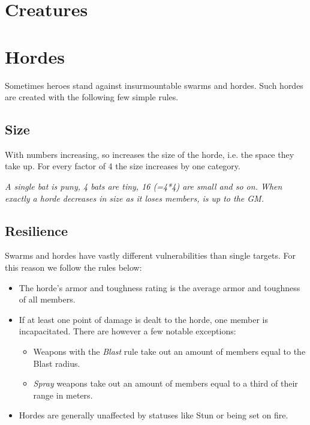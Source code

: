 \documentclass[12pt,a4paper,openany,usenames,dvipsnames]{book}
\begin{document}
	\vspace{5mm}
	

	\pagebreak

	\section{Creatures}
	\label{sec:creatures}
	

	\pagebreak
	\section{Hordes}
	Sometimes heroes stand against insurmountable swarms and hordes. Such hordes are created with the following few simple rules.
	
	\subsection*{Size}
	With numbers increasing, so increases the size of the horde, i.e. the space they take up. For every factor of 4 the size increases by one category.
	\begin{exampleblock}
		\itshape A single bat is puny, 4 bats are tiny, 16 (=4*4) are small and so on.
		When exactly a horde decreases in size as it loses members, is up to the GM.
	\end{exampleblock}
	
	\subsection*{Resilience}
	Swarms and hordes have vastly different vulnerabilities than single targets. For this reason we follow the rules below:
	\begin{itemize}
		\setlength\itemsep{-8mm} \vspace{-8mm}
		\item The horde's armor and toughness rating is the average armor and toughness of all members.
		\item If at least one point of damage is dealt to the horde, one member is incapacitated. There are however a few notable exceptions:
			\begin{itemize}
				\setlength\itemsep{-8mm} \vspace{-8mm}
				\item Weapons with the \emph{Blast} rule take out an amount of members equal to the Blast radius.
				\item \emph{Spray} weapons take out an amount of members equal to a third of their range in meters.
			\end{itemize}
		\item Hordes are generally unaffected by statuses like Stun or being set on fire.
	\end{itemize}
	
\end{document}
